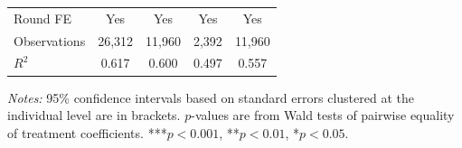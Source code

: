 \begin{table}[H]
\begin{threeparttable}
\begin{tabular}{l*{4}{c}}
Round FE    &                   Yes         &                   Yes         &                   Yes         &                   Yes         \\
Observations&                26,312         &                11,960         &                 2,392         &                11,960         \\
$R^2$       &                 0.617         &                 0.600         &                 0.497         &                 0.557         \\
\bottomrule\bottomrule
\end{tabular}
\begin{tablenotes}[flushleft]
\footnotesize
\item \textit{Notes:} 95\% confidence intervals based on standard errors clustered at the individual level are in brackets. $p$-values are from Wald tests of pairwise equality of treatment coefficients. ***$p<0.001$, **$p<0.01$, *$p<0.05$.
\end{tablenotes}
\end{threeparttable}
\end{table}
